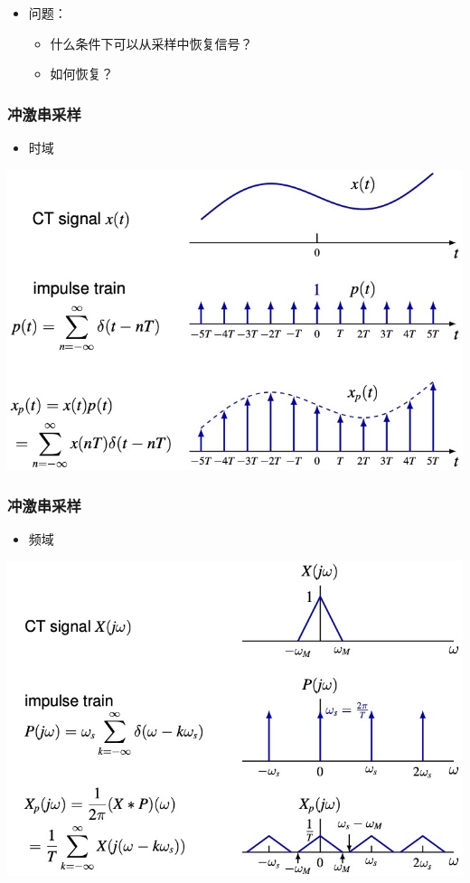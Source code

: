 \documentclass[CJKutf8,xcolor=pdftex,dvipsnames,table]{beamer}
\begin{document}
\begin{CJK*}{UTF8}{song}
\begin{frame}
\begin{itemize}
	\item 问题：
		\begin{itemize}
		\item 什么条件下可以从采样中恢复信号？
		\item 如何恢复？
		\end{itemize}
    \end{itemize}
  \end{frame}   
     
  \begin{frame}
    \frametitle{冲激串采样}
    \begin{itemize}
    \item 时域
    \end{itemize}
    \begin{center}
      \includegraphics[scale=.4]{impulse-train-sampling-time}
    \end{center}
  \end{frame}  
  
  \begin{frame}
    \frametitle{冲激串采样}
    \begin{itemize}
    \item 频域
    \end{itemize}
    \begin{center}
      \includegraphics[scale=.4]{impulse-train-sampling-freq}
    \end{center}
  \end{frame}        


\end{CJK*}
\end{document}
